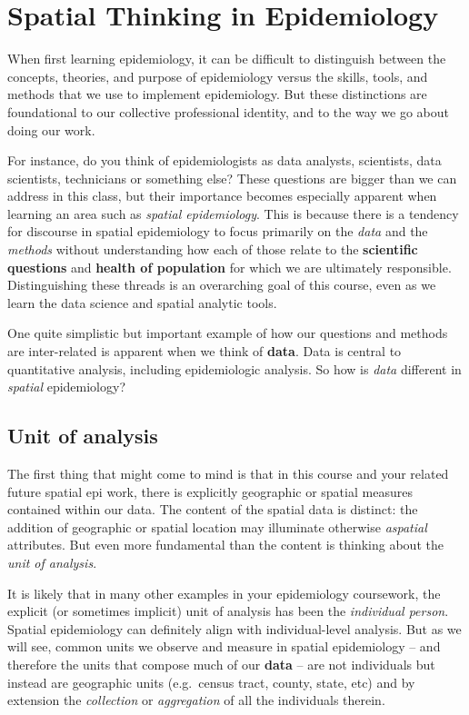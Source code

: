 \documentclass[
]{book}
\begin{document}
\hypertarget{spatial-thinking-in-epidemiology}{%
\section{Spatial Thinking in Epidemiology}\label{spatial-thinking-in-epidemiology}}

When first learning epidemiology, it can be difficult to distinguish between the concepts, theories, and purpose of epidemiology versus the skills, tools, and methods that we use to implement epidemiology. But these distinctions are foundational to our collective professional identity, and to the way we go about doing our work.

For instance, do you think of epidemiologists as data analysts, scientists, data scientists, technicians or something else? These questions are bigger than we can address in this class, but their importance becomes especially apparent when learning an area such as \emph{spatial epidemiology}. This is because there is a tendency for discourse in spatial epidemiology to focus primarily on the \emph{data} and the \emph{methods} without understanding how each of those relate to the \textbf{scientific questions} and \textbf{health of population} for which we are ultimately responsible. Distinguishing these threads is an overarching goal of this course, even as we learn the data science and spatial analytic tools.

One quite simplistic but important example of how our questions and methods are inter-related is apparent when we think of \textbf{data}. Data is central to quantitative analysis, including epidemiologic analysis. So how is \emph{data} different in \emph{spatial} epidemiology?

\hypertarget{unit-of-analysis}{%
\subsection{Unit of analysis}\label{unit-of-analysis}}

The first thing that might come to mind is that in this course and your related future spatial epi work, there is explicitly geographic or spatial measures contained within our data. The content of the spatial data is distinct: the addition of geographic or spatial location may illuminate otherwise \emph{aspatial} attributes. But even more fundamental than the content is thinking about the \emph{unit of analysis}.

It is likely that in many other examples in your epidemiology coursework, the explicit (or sometimes implicit) unit of analysis has been the \emph{individual person}. Spatial epidemiology can definitely align with individual-level analysis. But as we will see, common units we observe and measure in spatial epidemiology -- and therefore the units that compose much of our \textbf{data} -- are not individuals but instead are geographic units (e.g.~census tract, county, state, etc) and by extension the \emph{collection} or \emph{aggregation} of all the individuals therein.
\end{document}
